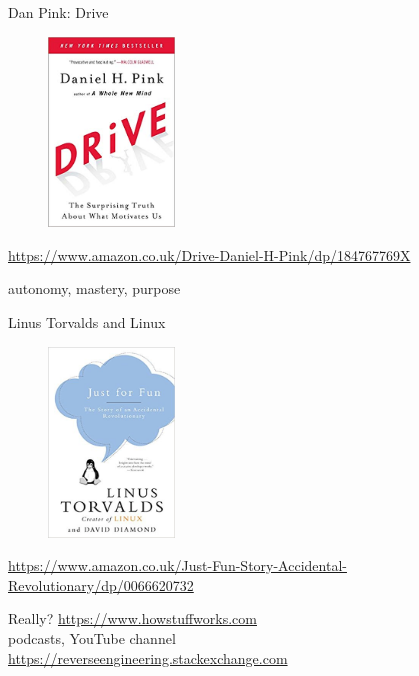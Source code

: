 \documentclass{simple}
\begin{document}
\begin{frame}{Dan Pink: Drive}
  \begin{figure}
    \centering
    \includegraphics[width=0.3\textwidth]{img/drive}
  \end{figure}
  \begin{center}
    \tiny
    \url{https://www.amazon.co.uk/Drive-Daniel-H-Pink/dp/184767769X}
  \end{center}
  \vspace{0.5cm}
  \centering
  \pause autonomy, mastery, purpose
\end{frame}

\begin{frame}{Linus Torvalds and Linux}
  \begin{figure}
    \centering
    \includegraphics[width=0.3\textwidth]{img/just-for-fun}
  \end{figure}
  \begin{center}
    \tiny
    \url{https://www.amazon.co.uk/Just-Fun-Story-Accidental-Revolutionary/dp/0066620732}
  \end{center}
\end{frame}

\begin{frame}{Really?}
  \centering
  \pause \url{https://www.howstuffworks.com} \\
  \vspace{0.5cm}
  \pause podcasts, YouTube channel \\
  \vspace{0.5cm}
  \pause \url{https://reverseengineering.stackexchange.com}
\end{frame}
\end{document}
